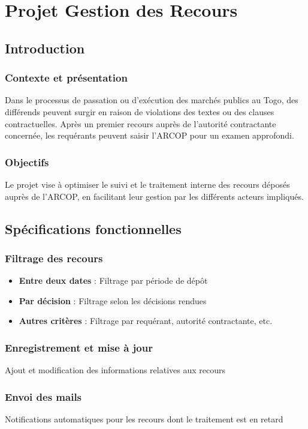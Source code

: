 \section{Projet Gestion des Recours}
\subsection{Introduction}
\subsubsection{Contexte et présentation}
Dans le processus de passation ou d'exécution des marchés publics au Togo, des différends peuvent surgir en raison de violations des textes ou des clauses contractuelles. Après un premier recours auprès de l'autorité contractante concernée, les requérants peuvent saisir l'ARCOP pour un examen approfondi.

\subsubsection{Objectifs}
Le projet vise à optimiser le suivi et le traitement interne des recours déposés auprès de l'ARCOP, en facilitant leur gestion par les différents acteurs impliqués.

\subsection{Spécifications fonctionnelles}
\subsubsection{Filtrage des recours}
\begin{itemize}
    \item \textbf{Entre deux dates} : Filtrage par période de dépôt
    \item \textbf{Par décision} : Filtrage selon les décisions rendues
    \item \textbf{Autres critères} : Filtrage par requérant, autorité contractante, etc.
\end{itemize}

\subsubsection{Enregistrement et mise à jour}
Ajout et modification des informations relatives aux recours

\subsubsection{Envoi des mails}
Notifications automatiques pour les recours dont le traitement est en retard

